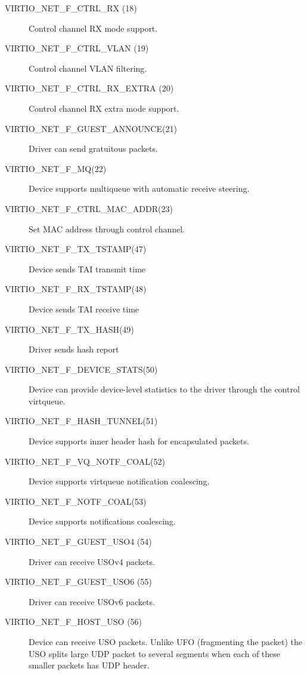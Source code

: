 \begin{description}
\item[VIRTIO_NET_F_CTRL_RX (18)] Control channel RX mode support.

\item[VIRTIO_NET_F_CTRL_VLAN (19)] Control channel VLAN filtering.

\item[VIRTIO_NET_F_CTRL_RX_EXTRA (20)]	Control channel RX extra mode support.

\item[VIRTIO_NET_F_GUEST_ANNOUNCE(21)] Driver can send gratuitous
    packets.

\item[VIRTIO_NET_F_MQ(22)] Device supports multiqueue with automatic
    receive steering.

\item[VIRTIO_NET_F_CTRL_MAC_ADDR(23)] Set MAC address through control
    channel.

\item[VIRTIO_NET_F_TX_TSTAMP(47)] Device sends TAI transmit time

\item[VIRTIO_NET_F_RX_TSTAMP(48)] Device sends TAI receive time

\item[VIRTIO_NET_F_TX_HASH(49)] Driver sends hash report

\item[VIRTIO_NET_F_DEVICE_STATS(50)] Device can provide device-level statistics
    to the driver through the control virtqueue.

\item[VIRTIO_NET_F_HASH_TUNNEL(51)] Device supports inner header hash for encapsulated packets.

\item[VIRTIO_NET_F_VQ_NOTF_COAL(52)] Device supports virtqueue notification coalescing.

\item[VIRTIO_NET_F_NOTF_COAL(53)] Device supports notifications coalescing.

\item[VIRTIO_NET_F_GUEST_USO4 (54)] Driver can receive USOv4 packets.

\item[VIRTIO_NET_F_GUEST_USO6 (55)] Driver can receive USOv6 packets.

\item[VIRTIO_NET_F_HOST_USO (56)] Device can receive USO packets. Unlike UFO
 (fragmenting the packet) the USO splits large UDP packet
 to several segments when each of these smaller packets has UDP header.


\end{description}
